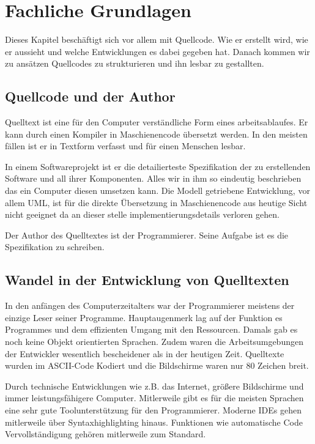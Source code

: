
\section{Fachliche Grundlagen}

Dieses Kapitel beschäftigt sich vor allem mit Quellcode.
Wie er erstellt wird, wie er aussieht und welche Entwicklungen es dabei gegeben hat.
Danach kommen wir zu ansätzen Quellcodes zu strukturieren und ihn lesbar zu gestallten.

\subsection{Quellcode und der Author}

Quelltext ist eine für den Computer verständliche Form
eines arbeitsablaufes. Er kann durch einen Kompiler in Maschienencode übersetzt werden.
In den meisten fällen ist er in Textform verfasst und für einen Menschen lesbar.

In einem Softwareprojekt ist er die detailierteste Spezifikation der zu erstellenden
Software und all ihrer Komponenten. Alles wir in ihm so eindeutig beschrieben
das ein Computer diesen umsetzen kann. Die Modell getriebene Entwicklung, vor allem
UML, ist für die direkte Übersetzung in Maschienencode aus heutige Sicht nicht geeignet
da an dieser stelle implementierungsdetails verloren gehen. \cite[S. 26]{Martin}

Der Author des Quelltextes ist der Programmierer. Seine Aufgabe ist es
die Spezifikation zu schreiben.

\subsection{Wandel in der Entwicklung von Quelltexten}

In den anfängen des Computerzeitalters war der Programmierer meistens der einzige
Leser seiner Programme. Hauptaugenmerk lag auf der Funktion es Programmes
und dem effizienten Umgang mit den Ressourcen. Damals gab es noch keine
Objekt orientierten Sprachen. Zudem waren die Arbeitsumgebungen der Entwickler
wesentlich bescheidener als in der heutigen Zeit. Quelltexte wurden im ASCII-Code
Kodiert und die Bildschirme waren nur 80 Zeichen breit.

Durch technische Entwicklungen wie z.B. das Internet, größere Bildschirme und
immer leistungsfähigere Computer. Mitlerweile gibt es für die meisten Sprachen
eine sehr gute Toolunterstützung für den Programmierer. Moderne IDEs gehen 
mitlerweile über Syntaxhighlighting hinaus. Funktionen wie automatische Code
Vervollständigung gehören mitlerweile zum Standard.

